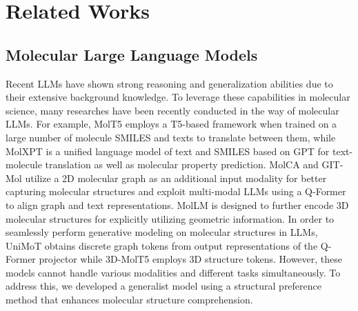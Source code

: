 \section{Related Works}
\label{sec:related_works}
\subsection{Molecular Large Language Models}
Recent LLMs have shown strong reasoning and generalization abilities due to their extensive background knowledge. To leverage these capabilities in molecular science, many researches have been recently conducted in the way of molecular LLMs. For example, MolT5 \cite{Edwards2022TranslationBM} employs a T5-based \cite{raffel2023exploringlimitstransferlearning} framework when trained on a large number of molecule SMILES and texts to translate between them, while MolXPT \cite{molxpt} is a unified language model of text and SMILES based on GPT \cite{radford2019language} for text-molecule translation as well as molecular property prediction. MolCA \cite{Liu2023MolCAMG} and GIT-Mol \cite{Liu_2024} utilize a 2D molecular graph as an additional input modality for better capturing molecular structures and exploit multi-modal LLMs using a Q-Former \cite{li2023blip2bootstrappinglanguageimagepretraining} to align graph and text representations. MolLM \cite{mollm} is designed to further encode 3D molecular structures for explicitly utilizing geometric information. In order to seamlessly perform generative modeling on molecular structures in LLMs, UniMoT \cite{zhang2024unimotunifiedmoleculetextlanguage} obtains discrete graph tokens from output representations of the Q-Former projector while 3D-MolT5 \cite{pei20243dmolt5unified3dmoleculetext} employs 3D structure tokens.
However, these models cannot handle various modalities and different tasks simultaneously.
To address this, we developed a generalist model using a structural preference method that enhances molecular structure comprehension.

